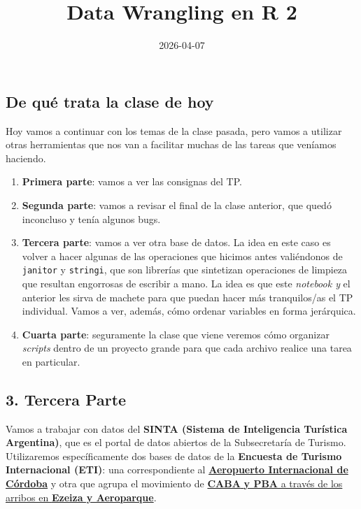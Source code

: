 \documentclass[
  spanish,
  letterpaper,
  DIV=11,
  numbers=noendperiod]{scrartcl}
\title{Data Wrangling en R 2}
\author{}
\date{2026-04-07}
\renewcommand*\contentsname{Tabla de contenidos}
\newcommand\contentsname{Tabla de contenidos}
\begin{document}
\maketitle

\renewcommand*\contentsname{Tabla de contenidos}
{
\setcounter{tocdepth}{3}
\tableofcontents
}

\subsection{De qué trata la clase de
hoy}\label{de-quuxe9-trata-la-clase-de-hoy}

Hoy vamos a continuar con los temas de la clase pasada, pero vamos a
utilizar otras herramientas que nos van a facilitar muchas de las tareas
que veníamos haciendo.

\begin{enumerate}
\def\labelenumi{\arabic{enumi}.}
\item
  \textbf{Primera parte}: vamos a ver las consignas del TP.
\item
  \textbf{Segunda parte}: vamos a revisar el final de la clase anterior,
  que quedó inconcluso y tenía algunos bugs.
\item
  \textbf{Tercera parte}: vamos a ver otra base de datos. La idea en
  este caso es volver a hacer algunas de las operaciones que hicimos
  antes valiéndonos de \texttt{janitor} y \texttt{stringi}, que son
  librerías que sintetizan operaciones de limpieza que resultan
  engorrosas de escribir a mano. La idea es que este \emph{notebook y}
  el anterior les sirva de machete para que puedan hacer más
  tranquilos/as el TP individual. Vamos a ver, además, cómo ordenar
  variables en forma jerárquica.
\item
  \textbf{Cuarta parte}: seguramente la clase que viene veremos cómo
  organizar \emph{scripts} dentro de un proyecto grande para que cada
  archivo realice una tarea en particular.
\end{enumerate}

\subsection{3. Tercera Parte}\label{tercera-parte}

Vamos a trabajar con datos del \textbf{SINTA (Sistema de Inteligencia
Turística Argentina)}, que es el portal de datos abiertos de la
Subsecretaría de Turismo. Utilizaremos específicamente dos bases de
datos de la \textbf{Encuesta de Turismo Internacional (ETI)}: una
correspondiente al
\href{https://datos.yvera.gob.ar/dataset/encuesta-turismo-internacional/archivo/dae8b7f8-f3dc-431b-887e-3de4b54f09a9}{\textbf{Aeropuerto
Internacional de Córdoba}} y otra que agrupa el movimiento de
\href{https://datos.yvera.gob.ar/dataset/encuesta-turismo-internacional/archivo/32cd65c4-7558-48cf-a8ac-bbb07147b5a1}{\textbf{CABA}
\textbf{y PBA} a través de los arribos en \textbf{Ezeiza y Aeroparque}}.
\end{document}
